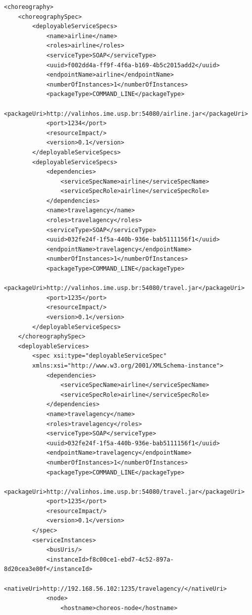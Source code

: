 \documentclass[a4paper, 10pt]{article}
\begin{document}
{\begin{lstlisting}[caption=Choreography XML representation example, label=lst:chor_xml]
<choreography>
    <choreographySpec>
        <deployableServiceSpecs>
            <name>airline</name>
            <roles>airline</roles>
            <serviceType>SOAP</serviceType>
            <uuid>f002dd4a-ff9f-4f6a-b169-4b5c2015add2</uuid>
            <endpointName>airline</endpointName>
            <numberOfInstances>1</numberOfInstances>
            <packageType>COMMAND_LINE</packageType>
            <packageUri>http://valinhos.ime.usp.br:54080/airline.jar</packageUri>
            <port>1234</port>
            <resourceImpact/>
            <version>0.1</version>
        </deployableServiceSpecs>
        <deployableServiceSpecs>
            <dependencies>
                <serviceSpecName>airline</serviceSpecName>
                <serviceSpecRole>airline</serviceSpecRole>
            </dependencies>
            <name>travelagency</name>
            <roles>travelagency</roles>
            <serviceType>SOAP</serviceType>
            <uuid>032fe24f-1f5a-440b-936e-bab5111156f1</uuid>
            <endpointName>travelagency</endpointName>
            <numberOfInstances>1</numberOfInstances>
            <packageType>COMMAND_LINE</packageType>
            <packageUri>http://valinhos.ime.usp.br:54080/travel.jar</packageUri>
            <port>1235</port>
            <resourceImpact/>
            <version>0.1</version>
        </deployableServiceSpecs>
    </choreographySpec>
    <deployableServices>
        <spec xsi:type="deployableServiceSpec" 
        xmlns:xsi="http://www.w3.org/2001/XMLSchema-instance">
            <dependencies>
                <serviceSpecName>airline</serviceSpecName>
                <serviceSpecRole>airline</serviceSpecRole>
            </dependencies>
            <name>travelagency</name>
            <roles>travelagency</roles>
            <serviceType>SOAP</serviceType>
            <uuid>032fe24f-1f5a-440b-936e-bab5111156f1</uuid>
            <endpointName>travelagency</endpointName>
            <numberOfInstances>1</numberOfInstances>
            <packageType>COMMAND_LINE</packageType>
            <packageUri>http://valinhos.ime.usp.br:54080/travel.jar</packageUri>
            <port>1235</port>
            <resourceImpact/>
            <version>0.1</version>
        </spec>
        <serviceInstances>
            <busUris/>
            <instanceId>f8c00ce1-ebd7-4c52-897a-8d20cea3e80f</instanceId>
            <nativeUri>http://192.168.56.102:1235/travelagency/</nativeUri>
            <node>
                <hostname>choreos-node</hostname>

\end{lstlisting}}
\end{document}
